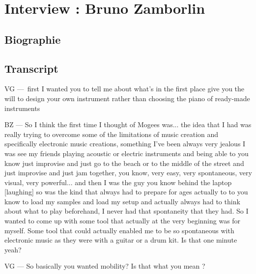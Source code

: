 \chapter{Interview : Bruno Zamborlin}

\section*{Biographie}


\section*{Transcript}


VG — first I wanted you to tell me about what's in the first place give you the will to design your own instrument rather than choosing the piano of ready-made instruments 

BZ — So I think the first time I thought of Mogees was... the idea that I had was really trying to overcome some of the limitations of music creation and specifically electronic music creations, something I've been always very jealous I was see my friends playing acoustic or electric instruments and being able to you know just improvise and just go to the beach or to the middle of the street and just improvise and just jam together, you know, very easy, very spontaneous, very visual, very powerful... and then I was the guy you know behind the laptop [laughing] so was the kind that always had to prepare for ages actually to to you know to load my samples and load my setup and actually always had to think about what to play beforehand, I never had that spontaneity that they had. So I wanted to come up with some tool that actually at the very beginning was for myself. Some tool that could actually enabled me to be so spontaneous with electronic music as they were with a guitar or a drum kit. Is that one minute yeah? 

VG — So basically you wanted mobility? Is that what you mean ?


